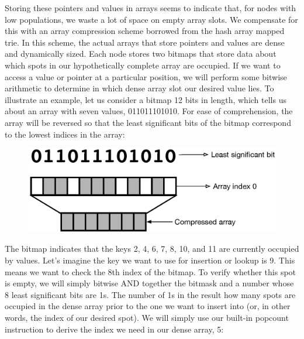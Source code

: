 \documentclass[preprint]{sigplanconf}
\begin{document}
Storing these pointers and values in arrays seems to indicate that, for nodes with low populations, we waste a lot of space on empty array slots.
We compensate for this with an array compression scheme borrowed from the hash array mapped trie.
In this scheme, the actual arrays that store pointers and values are dense and dynamically sized.
Each node stores two bitmaps that store data about which spots in our hypothetically complete array are occupied. 
If we want to access a value or pointer at a particular position, we will perform some bitwise arithmetic to determine in which dense array slot our desired value lies.
To illustrate an example, let us consider a bitmap 12 bits in length, which tells us about an array with seven values, 011011101010.
For ease of comprehension, the array will be reversed so that the least significant bits of the bitmap correspond to the lowest indices in the array:
\begin{figure}[H]
\includegraphics[scale=.5]{bitmask}
\centering
\end{figure}
The bitmap indicates that the keys 2, 4, 6, 7, 8, 10, and 11 are currently occupied by values.
Let's imagine the key we want to use for insertion or lookup is 9.
This means we want to check the 8th index of the bitmap. To verify whether this spot is empty, we will simply bitwise AND together the bitmask and a number whose 8 least significant bits are 1s.
The number of 1s in the result how many spots are occupied in the dense array prior to the one we want to insert into (or, in other words, the index of our desired spot).
We will simply use our built-in popcount instruction to derive the index we need in our dense array, 5:
\end{document}
